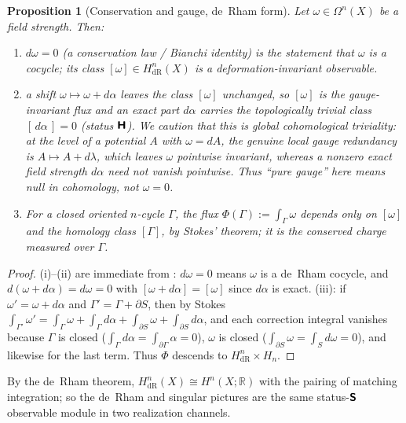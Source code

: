 \documentclass[12pt]{article}
\newtheorem{proposition}[proposition]{Proposition}
\theoremstyle{definition}
\theoremstyle{remark}
\newcommand{\Rm}{\mathbb{R}}
\newcommand{\Sfont}{\textnormal{\sffamily\bfseries S}}
\newcommand{\Hfont}{\textnormal{\sffamily\bfseries H}}
\begin{document}
\begin{proposition}[Conservation and gauge, de~Rham form]
\label{prop:derham-gauge}
Let $\omega\in\Omega^n(X)$ be a field strength. Then:
\begin{enumerate}
  \item[(i)] $d\omega=0$ (a conservation law / Bianchi identity) is the statement
    that $\omega$ is a cocycle; its class $[\omega]\in H^n_{\mathrm{dR}}(X)$ is a
    deformation-invariant observable.
  \item[(ii)] a shift $\omega\mapsto\omega+d\alpha$ leaves the class $[\omega]$
    unchanged, so $[\omega]$ is the gauge-invariant flux and an exact part
    $d\alpha$ carries the topologically trivial class $[\,d\alpha\,]=0$ (status
    $\Hfont$). We caution that this is \emph{global} cohomological triviality: at
    the level of a potential $A$ with $\omega=dA$, the genuine local gauge
    redundancy is $A\mapsto A+d\lambda$, which leaves $\omega$ pointwise
    invariant, whereas a nonzero exact field strength $d\alpha$ need not vanish
    pointwise. Thus ``pure gauge'' here means null in cohomology, not $\omega=0$.
  \item[(iii)] For a closed oriented $n$-cycle $\Gamma$, the flux
    $\Phi(\Gamma):=\int_\Gamma\omega$ depends only on $[\omega]$ and the homology
    class $[\Gamma]$, by Stokes' theorem; it is the conserved charge measured over
    $\Gamma$.
\end{enumerate}
\end{proposition}

\begin{proof}
(i)--(ii) are immediate from : $d\omega=0$ means $\omega$ is a
de~Rham cocycle, and $d(\omega+d\alpha)=d\omega=0$ with
$[\omega+d\alpha]=[\omega]$ since $d\alpha$ is exact. (iii): if $\omega'=\omega+d\alpha$
and $\Gamma'=\Gamma+\partial S$, then by Stokes
$\int_{\Gamma'}\omega'=\int_\Gamma\omega+\int_\Gamma d\alpha+\int_{\partial S}\omega+\int_{\partial S}d\alpha$,
and each correction integral vanishes because $\Gamma$ is closed
($\int_\Gamma d\alpha=\int_{\partial\Gamma}\alpha=0$), $\omega$ is closed
($\int_{\partial S}\omega=\int_S d\omega=0$), and likewise for the last term.
Thus $\Phi$ descends to $H^n_{\mathrm{dR}}\times H_n$.
\end{proof}

By the de~Rham theorem, $H^n_{\mathrm{dR}}(X)\cong H^n(X;\Rm)$ with the pairing of
 matching integration; so the de~Rham and singular pictures are
the same status-$\Sfont$ observable module in two realization channels.
\end{document}
